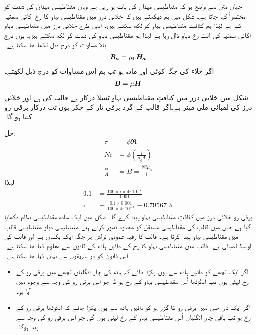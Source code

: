 جہاں متن سے واضح ہو کہ مقناطیسی میدان کی بات ہو رہی ہے وہاں مقناطیسی میدان کی شدت کو مختصراً  کہا جاتا ہے۔  شکل  میں ہم دیکھتے ہیں کہ خلائی درز میں مقناطیسی بہاو کا رخ  اکائی سمتیہ  کے  ہے لہٰذا ہم کثافتِ مقناطیسی بہاو کو  لکھ سکتے ہیں۔ اسی طرح خلائی درز میں مقناطیسی دباو  اکائی سمتیہ  کی الٹ رخ دباو ڈال رہا ہے لہٰذا ہم مقناطیسی دباو کی شدت کو  لکھ سکتے ہیں۔ یوں درج بالا مساوات کو درج ذیل لکھا جا سکتا ہے۔
\begin{align}
{\ensuremath{{\boldsymbol{B_a}}}}=\mu_0 {{\boldsymbol{H_a}}}
\end{align}
اگر خلاء کی جگہ کوئی اور مادہ ہو تب ہم اس مساوات کو درج ذیل لکھتے۔
\begin{align}
{\ensuremath{{\boldsymbol{B}}}}=\mu {\ensuremath{{\boldsymbol{H}}}}
\end{align}
%
شکل  میں خلائی درز میں کثافتِ مقناطیسی بہاو  ٹسلا درکار ہے۔قالب کی   ہے اور خلائی درز کی لمبائی  ملی میٹر ہے۔اگر  قالب کے گرد برقی تار کے  چکر ہوں تب درکار برقی رو  کتنا ہو گا۔

حل:
\begin{align*}
\tau&=\phi \Re\\
N i &= \phi \left(\frac{l}{\mu_0 A} \right)\\
\frac{\phi}{A}&=B=\frac{ N i \mu_0}{l}
\end{align*}
لہٰذا
\begin{align*}
0.1&=\frac{100 \times i \times 4 \pi  10^{-7}}{0.001}\\
i&=\frac{0.1 \times 0.001}{100 \times 4 \pi  10^{-7}}=\SI{0.79567}{\ampere}
\end{align*}
 برقی رو  خلائی درز میں  کثافتِ مقناطیسی بہاو پیدا کرے گا۔
%
شکل  میں ایک سادہ مقناطیسی نظام دکھایا گیا ہے جس میں قالب کی مقناطیسی مستقل کو محدود تصور کرتے ہیں۔مقناطیسی دباو   مقناطیسی قالب میں مقناطیسی بہاو  پیدا کرتا ہے۔ قالب کا رقبہ عمودی تراش   ہر جگہ ایک یکساں ہے اور قالب  کی اوسط لمبائی  ہے۔ قالب میں مقناطیسی بہاو  کا رخ   کے دائیں ہاتھ کے قانون  سے معلوم کیا جا سکتا ہے۔اس قانون کو دو طریقوں سے بیان کیا جا سکتا ہے۔
\begin{itemize}
\item
اگر ایک لچھے کو دائیں ہاتھ سے یوں پکڑا  جائے کہ ہاتھ کی چار انگلیاں لچھے میں برقی رو کے رخ لپٹی  ہوں تب انگوٹھا اُس مقناطیسی بہاو کے رخ ہو گا جو اس برقی رو کی وجہ سے وجود میں آیا ہو۔
\item
اگر ایک تار جس میں برقی رو کا گزر ہو کو دائیں ہاتھ سے یوں پکڑا جائے کہ انگوٹھا  برقی رو  کے رخ ہو تب باقی چار انگلیاں اُس مقناطیسی  بہاو کے رخ لپٹی ہوں گی  جو اس برقی رو کی وجہ سے  پیدا ہوگا۔
\end{itemize}

